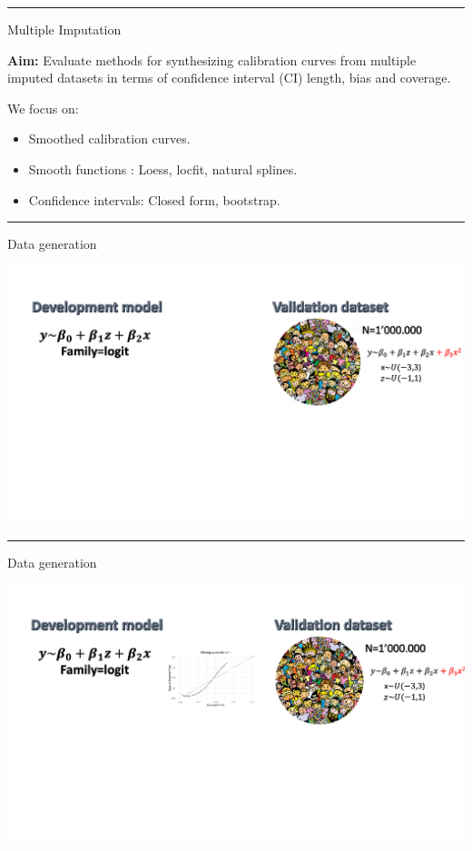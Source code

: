 \documentclass[
  letterpaper,
  DIV=11,
  numbers=noendperiod]{scrartcl}
\providecommand{\tightlist}{%
  \setlength{\itemsep}{0pt}\setlength{\parskip}{0pt}}\usepackage{longtable,booktabs,array}
\begin{document}
\begin{center}\rule{0.5\linewidth}{0.5pt}\end{center}

{ Multiple Imputation}

\textbf{Aim:} Evaluate methods for synthesizing calibration curves from
multiple imputed datasets in terms of confidence interval (CI) length,
bias and coverage.

We focus on:

\begin{itemize}
\tightlist
\item
  Smoothed calibration curves.
\item
  Smooth functions : Loess, locfit, natural splines.
\item
  Confidence intervals: Closed form, bootstrap.
\end{itemize}

\begin{center}\rule{0.5\linewidth}{0.5pt}\end{center}

{ Data generation}

\includegraphics{images/d1.png}

\begin{center}\rule{0.5\linewidth}{0.5pt}\end{center}

{ Data generation}

\includegraphics{images/d2.png}
\end{document}
